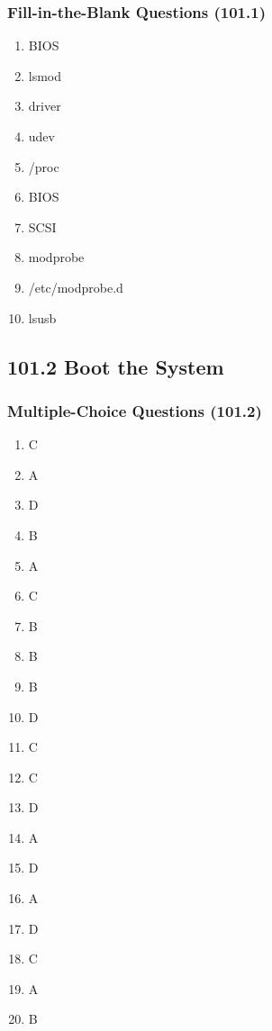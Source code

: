 \documentclass[12pt,a4paper]{report}
\begin{document}
\subsubsection*{Fill-in-the-Blank Questions (101.1)}
\begin{enumerate}[1.]
    \item BIOS
    \item lsmod
    \item driver
    \item udev
    \item /proc
    \item BIOS
    \item SCSI
    \item modprobe
    \item /etc/modprobe.d
    \item lsusb
    \end{enumerate}


    \subsection*{101.2 Boot the System}
    \subsubsection*{Multiple-Choice Questions (101.2)}
\begin{enumerate}[1.]
    \item C
    \item A
    \item D
    \item B
    \item A
    \item C
    \item B
    \item B
    \item B
    \item D
    \item C
    \item C
    \item D
    \item A
    \item D
    \item A
    \item D
    \item C
    \item A
    \item B
    \end{enumerate}
\end{document}
